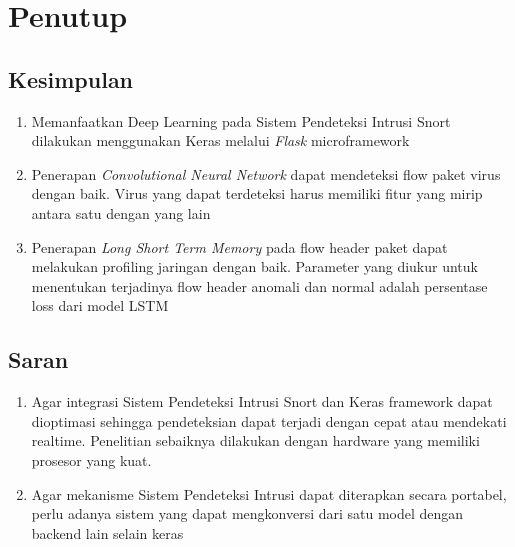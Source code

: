\documentclass[./skripsi.tex]{subfiles}
\begin{document}
\chapter{Penutup}
\section{Kesimpulan}
\begin{enumerate}
    \item Memanfaatkan Deep Learning pada Sistem Pendeteksi Intrusi Snort dilakukan menggunakan Keras melalui \textit{Flask} microframework
    \item Penerapan \textit{Convolutional Neural Network} dapat mendeteksi flow paket virus dengan baik. Virus yang dapat terdeteksi harus memiliki fitur yang mirip antara satu dengan yang lain
    \item Penerapan \textit{Long Short Term Memory} pada flow header paket dapat melakukan profiling jaringan dengan baik. Parameter yang diukur untuk menentukan terjadinya flow header anomali dan normal adalah persentase loss dari model LSTM
\end{enumerate}
\section{Saran}
\begin{enumerate}
    \item Agar integrasi Sistem Pendeteksi Intrusi Snort dan Keras framework dapat dioptimasi sehingga pendeteksian dapat terjadi dengan cepat atau mendekati realtime. Penelitian sebaiknya dilakukan dengan hardware yang memiliki prosesor yang kuat.
    \item Agar mekanisme Sistem Pendeteksi Intrusi dapat diterapkan secara portabel, perlu adanya sistem yang dapat mengkonversi dari satu model dengan backend lain selain keras
\end{enumerate}
\end{document}
